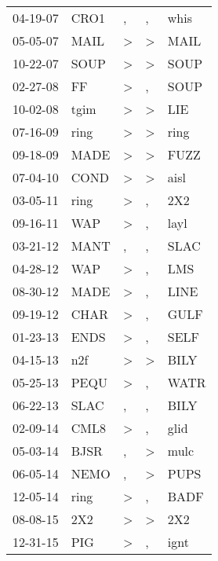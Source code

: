 \begin{supertabular}{lllll}
 04-19-07 &   CRO1 &                , &                , &   whis \\
 05-05-07 &   MAIL &     \textgreater &     \textgreater &   MAIL \\
 10-22-07 &   SOUP &     \textgreater &     \textgreater &   SOUP \\
 02-27-08 &     FF &     \textgreater &                , &   SOUP \\
 10-02-08 &   tgim &     \textgreater &     \textgreater &    LIE \\
 07-16-09 &   ring &     \textgreater &     \textgreater &   ring \\
 09-18-09 &   MADE &     \textgreater &     \textgreater &   FUZZ \\
 07-04-10 &   COND &     \textgreater &     \textgreater &   aisl \\
 03-05-11 &   ring &     \textgreater &                , &    2X2 \\
 09-16-11 &    WAP &     \textgreater &                , &   layl \\
 03-21-12 &   MANT &                , &                , &   SLAC \\
 04-28-12 &    WAP &     \textgreater &                , &    LMS \\
 08-30-12 &   MADE &     \textgreater &                , &   LINE \\
 09-19-12 &   CHAR &     \textgreater &                , &   GULF \\
 01-23-13 &   ENDS &     \textgreater &                , &   SELF \\
 04-15-13 &    n2f &     \textgreater &     \textgreater &   BILY \\
 05-25-13 &   PEQU &     \textgreater &                , &   WATR \\
 06-22-13 &   SLAC &                , &                , &   BILY \\
 02-09-14 &   CML8 &     \textgreater &                , &   glid \\
 05-03-14 &   BJSR &                , &     \textgreater &   mulc \\
 06-05-14 &   NEMO &                , &     \textgreater &   PUPS \\
 12-05-14 &   ring &     \textgreater &                , &   BADF \\
 08-08-15 &    2X2 &     \textgreater &     \textgreater &    2X2 \\
 12-31-15 &    PIG &     \textgreater &                , &   ignt \\

\end{supertabular}
